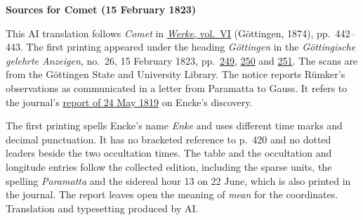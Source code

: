 \clearpage\thispagestyle{empty}
\begin{center}\textbf{Sources for Comet (15 February 1823)}\end{center}
\noindent This AI translation follows \textit{Comet} in \href{https://gdz.sub.uni-goettingen.de/id/PPN236007467}{\textit{Werke}, vol.~VI} (Göttingen, 1874), pp.~442--443. The first printing appeared under the heading \textit{Göttingen} in the \textit{Göttingische gelehrte Anzeigen}, no.~26, 15 February 1823, pp.~\href{https://images.p.sub.uni-goettingen.de/iiif/image/gdz:PPN385030444_1823_1:00000251/full/1600,/0/default.jpg}{249}, \href{https://images.p.sub.uni-goettingen.de/iiif/image/gdz:PPN385030444_1823_1:00000252/full/1600,/0/default.jpg}{250} and \href{https://images.p.sub.uni-goettingen.de/iiif/image/gdz:PPN385030444_1823_1:00000253/full/1600,/0/default.jpg}{251}. The scans are from the Göttingen State and University Library. The notice reports Rümker’s observations as communicated in a letter from Paramatta to Gauss. It refers to the journal’s \hyperlink{native-425}{report of 24 May 1819} on Encke’s discovery.
\par\smallskip\noindent The first printing spells Encke’s name \textit{Enke} and uses different time marks and decimal punctuation. It has no bracketed reference to p.~420 and no dotted leaders beside the two occultation times. The table and the occultation and longitude entries follow the collected edition, including the sparse units, the spelling \textit{Paramatta} and the sidereal hour 13 on 22 June, which is also printed in the journal. The report leaves open the meaning of \textit{mean} for the coordinates. Translation and typesetting produced by AI.
\clearpage
